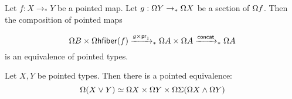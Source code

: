 
\newcommand{\hfiber}{\ensuremath{\mathsf{hfiber}}}
\newcommand{\concat}{\ensuremath{\mathsf{concat}}}

\begin{lemma}
    Let $f : X \to_* Y$ be a pointed map. Let $g : \Omega Y \to_* \Omega X$ be a section of $\Omega f$. Then the composition of pointed maps
    
    \begin{equation*}
        \loops B \times \loops \hfiber(f) \xrightarrow{g \times \mathsf{pr}_1}_*
            \loops A \times \loops A \xrightarrow{\concat}_* \loops A    
    \end{equation*}
    is an equivalence of pointed types.

\end{lemma}

%
%

\begin{theorem}
    Let $X, Y$ be pointed types. Then there is a pointed equivalence:
    \begin{equation*}
        \Omega (X \vee Y) \simeq \Omega X \times \Omega Y \times \Omega \Sigma (\Omega X \wedge \Omega Y)
    \end{equation*}
\end{theorem}
